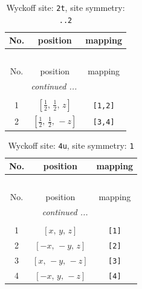 \documentclass[fleqn,8pt]{jsarticle}
\begin{document}
\begin{longtable}{ccc}
\caption{Wyckoff site: {\tt 2t}, site symmetry: {\tt ..2}}
 \\
 \hline \hline
No. & position & mapping \\ \hline \endfirsthead

\multicolumn{2}{l}{\tablename\ \thetable{}} \\
 \hline \hline
No. & position & mapping \\ \hline \endhead

 \hline \hline
\multicolumn{2}{r}{\footnotesize\it continued ...} \\ \endfoot

 \hline \hline
\multicolumn{2}{r}{} \\ \endlastfoot

1 & $\left[ \frac{1}{2},\, \frac{1}{2},\, z \right]$ & {\tt [1,2]} \\ \hline
2 & $\left[ \frac{1}{2},\, \frac{1}{2},\, - z \right]$ & {\tt [3,4]} \\
\end{longtable}
\renewcommand{\arraystretch}{1.2}
\begin{longtable}{ccc}
\caption{Wyckoff site: {\tt 4u}, site symmetry: {\tt 1}}
 \\
 \hline \hline
No. & position & mapping \\ \hline \endfirsthead

\multicolumn{2}{l}{\tablename\ \thetable{}} \\
 \hline \hline
No. & position & mapping \\ \hline \endhead

 \hline \hline
\multicolumn{2}{r}{\footnotesize\it continued ...} \\ \endfoot

 \hline \hline
\multicolumn{2}{r}{} \\ \endlastfoot

1 & $\left[ x,\, y,\, z \right]$ & {\tt [1]} \\ \hline
2 & $\left[ - x,\, - y,\, z \right]$ & {\tt [2]} \\ \hline
3 & $\left[ x,\, - y,\, - z \right]$ & {\tt [3]} \\ \hline
4 & $\left[ - x,\, y,\, - z \right]$ & {\tt [4]} \\
\end{longtable}
\end{document}
